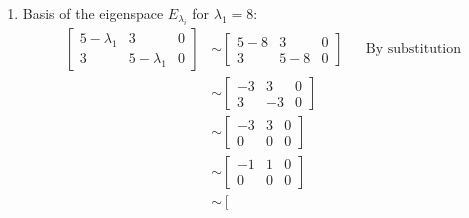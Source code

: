 \documentclass[10pt,letterpaper,final]{report}
\newcommand{\reason}[1]{&& \text{#1}}
\begin{document}
\begin{enumerate}[label=(\alph*)]
        \begin{enumerate}[label=(\arabic*)]
          \item Basis of the eigenspace $E_{\lambda_i}$ for $\lambda_1 = 8$:
                \begin{align*}
                  \left[\begin{array}{rr|r}
                      5 - \lambda_1 & 3             & 0 \\
                      3             & 5 - \lambda_1 & 0
                    \end{array}\right] & \sim \left[\begin{array}{rr|r}
                                                  5 - 8 & 3     & 0 \\
                                                  3     & 5 - 8 & 0
                                                \end{array}\right] \reason{By substitution} \\[1ex]
                                                           & \sim \left[\begin{array}{rr|r}
                                                                      -3 & 3  & 0 \\
                                                                      3  & -3 & 0
                                                                    \end{array}\right]  \\[1ex]
                                                           & \sim \left[\begin{array}{rr|r}
                                                                      -3 & 3 & 0 \\
                                                                      0  & 0 & 0
                                                                    \end{array}\right]  \\[1ex]
                                                           & \sim \left[\begin{array}{rr|r}
                                                                      -1 & 1 & 0 \\
                                                                      0  & 0 & 0
                                                                    \end{array}\right]  \\[1ex]
                                                           & \sim \left[\begin{array}{rr|r}

\end{array}
\end{align*}
\end{enumerate}
\end{enumerate}
\end{document}
